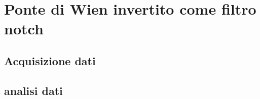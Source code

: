 \section{Ponte di Wien invertito come filtro notch}
\subsection{Acquisizione dati}
\subsection{analisi dati}